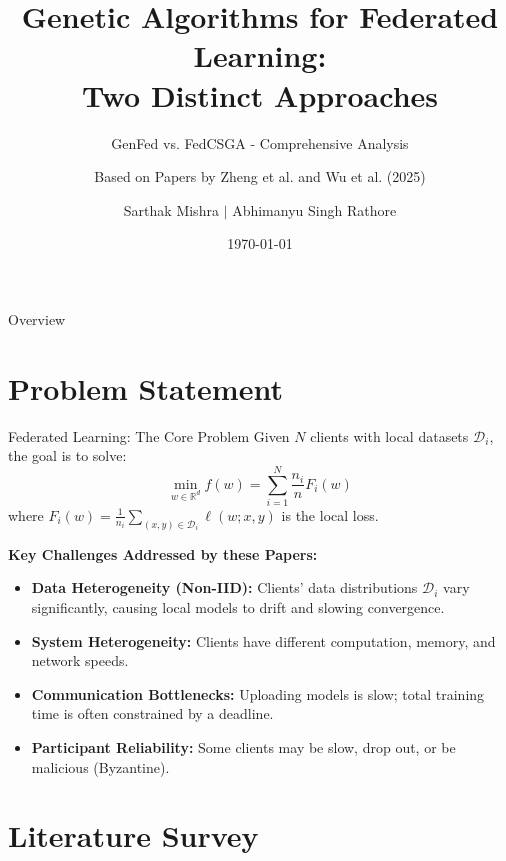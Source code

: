 \documentclass{beamer}
\title{Genetic Algorithms for Federated Learning:\\Two Distinct Approaches}
\subtitle{GenFed vs. FedCSGA - Comprehensive Analysis}
\author{Based on Papers by Zheng et al. and Wu et al. (2025)}
\author[Team 12]{Sarthak Mishra $|$ Abhimanyu Singh Rathore}
\institute{CS6007 Project}
\date{\today}
\begin{document}
\begin{frame}
\titlepage
\end{frame}

\begin{frame}{Overview}
\tableofcontents
\end{frame}

\section{Problem Statement}

\begin{frame}{Federated Learning: The Core Problem}
Given $N$ clients with local datasets $\mathcal{D}_i$, the goal is to solve:
\begin{equation}
\min_{w \in \mathbb{R}^d} f(w) = \sum_{i=1}^{N} \frac{n_i}{n} F_i(w)
\end{equation}
where $F_i(w) = \frac{1}{n_i}\sum_{(x,y) \in \mathcal{D}_i} \ell(w; x, y)$ is the local loss.

\vspace{0.3cm}
\textbf{Key Challenges Addressed by these Papers:}
\begin{itemize}
    \item \textbf{Data Heterogeneity (Non-IID):} Clients' data distributions $\mathcal{D}_i$ vary significantly, causing local models to drift and slowing convergence.
    \item \textbf{System Heterogeneity:} Clients have different computation, memory, and network speeds.
    \item \textbf{Communication Bottlenecks:} Uploading models is slow; total training time is often constrained by a deadline.
    \item \textbf{Participant Reliability:} Some clients may be slow, drop out, or be malicious (Byzantine).
\end{itemize}
\end{frame}

\section{Literature Survey}
\end{document}
